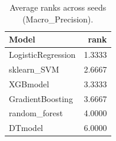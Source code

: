 \begin{table}[t]
\centering
\begin{tabular}{lr}
\toprule
Model & rank \\
\midrule
LogisticRegression & 1.3333 \\
sklearn_SVM & 2.6667 \\
XGBmodel & 3.3333 \\
GradientBoosting & 3.6667 \\
random_forest & 4.0000 \\
DTmodel & 6.0000 \\
\bottomrule
\end{tabular}
\caption{Average ranks across seeds (Macro_Precision).}
\label{tab:avg_rank_Macro_Precision}
\end{table}